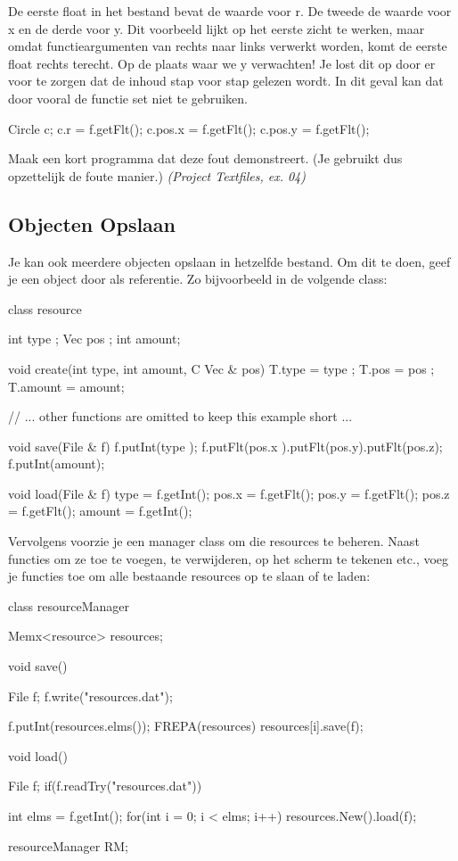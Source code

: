 De eerste float in het bestand bevat de waarde voor r. De tweede de waarde voor x en de derde voor y. Dit voorbeeld lijkt op het eerste zicht te werken, maar omdat functieargumenten van rechts naar links verwerkt worden, komt de eerste float rechts terecht. Op de plaats waar we y verwachten! Je lost dit op door er voor te zorgen dat de inhoud stap voor stap gelezen wordt. In dit geval kan dat door vooral de functie set niet te gebruiken.

\begin{code}
Circle c;
c.r     = f.getFlt();
c.pos.x = f.getFlt();
c.pos.y = f.getFlt();
\end{code}

\begin{exercise}
Maak een kort programma dat deze fout demonstreert. (Je gebruikt dus opzettelijk de foute manier.) \textsl{(Project Textfiles, ex. 04)}
\end{exercise}

\subsection{Objecten Opslaan}
Je kan ook meerdere objecten opslaan in hetzelfde bestand. Om dit te doen, geef je een  object door als referentie. Zo bijvoorbeeld in de volgende class:

\begin{code}
class resource {
  int type  ;
	Vec pos   ;
	int amount;
	
	void create(int type, int amount, C Vec & pos) {
	  T.type   = type  ;
		T.pos    = pos   ;
		T.amount = amount;
	}
	
	// ... other functions are omitted to keep this example short ...
	
	void save(File & f) {
	  f.putInt(type  );
		f.putFlt(pos.x ).putFlt(pos.y).putFlt(pos.z);
		f.putInt(amount);
	}
	
	void load(File & f) {
	  type   = f.getInt();
		pos.x  = f.getFlt();
		pos.y  = f.getFlt();
		pos.z  = f.getFlt();
		amount = f.getInt();
	}
}	
\end{code}

Vervolgens voorzie je een manager class om die resources te beheren. Naast functies om ze toe te voegen, te verwijderen, op het scherm te tekenen etc., voeg je functies toe om alle bestaande resources op te slaan of te laden:

\begin{code}
class resourceManager {
  Memx<resource> resources;
	
	void save() {
		File f;
		f.write("resources.dat");
		
		f.putInt(resources.elms());
		FREPA(resources) {
			resources[i].save(f);
		}
	}
	
	void load() {
	  File f;
		if(f.readTry("resources.dat")) {
			
			int elms = f.getInt();
			for(int i = 0; i < elms; i++) {
				resources.New().load(f);
			}
		}
	}
}

resourceManager RM;
\end{code}

